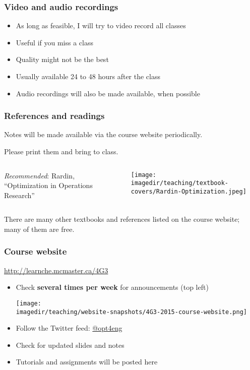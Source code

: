 \begin{frame}\frametitle{Video and audio recordings}
	\begin{itemize}
		\item	As long as feasible, I will try to video record all classes
		\item	Useful if you miss a class
		\item	Quality might not be the best
		\item	Usually available 24 to 48 hours after the class
		\item	Audio recordings will also be made available, when possible
	\end{itemize}
\end{frame}

\begin{frame}\frametitle{References and readings}

	Notes will be made available via the course website periodically.
	
	Please print them and bring to class.


	\vspace{12pt}

	\begin{columns}[t]
			\emph{Recommended}: Rardin, ``Optimization in Operations Research'' 
			\vspace{-1cm}
			\begin{center}
				\texttt{[image: \\imagedir/teaching/textbook-covers/Rardin-Optimization.jpeg]}
			\end{center}
	\end{columns}

	\vspace{12pt}
	There are many other textbooks and references listed on the course website; many of them are free.
\end{frame}

\begin{frame}\frametitle{Course website}
	\begin{exampleblock}{}
		\centering
		\href{http://learnche.mcmaster.ca/4G3}{http://learnche.mcmaster.ca/4G3}
	\end{exampleblock}
	
	\vspace{1cm}
	\begin{itemize}
		\item	Check \textbf{several times per week} for announcements {\tiny (top left)}
		\begin{flushright}
			\texttt{[image: \\imagedir/teaching/website-snapshots/4G3-2015-course-website.png]}
		\end{flushright}

		\vspace{0cm}
		\item	Follow the Twitter feed: \href{https://twitter.com/opt4eng}{@opt4eng}
		\item	Check for updated slides and notes
		\item	Tutorials and assignments will be posted here
	\end{itemize}
\end{frame}

